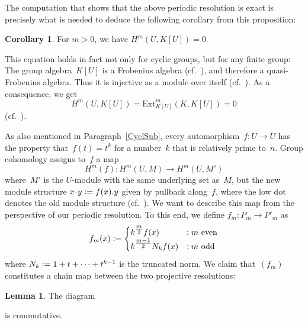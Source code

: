 \documentclass[12pt]{article}
\newcounter{num}
\theoremstyle{definition}
\newtheorem{Lemma}[Satz]{Lemma}
\newtheorem{Cor}[Satz]{Corollary}
\theoremstyle{break}
\newcommand{\Ext}{\mathrm{Ext}}
\renewcommand{\1}{\mathbbm{1}}
\newcommand{\deq}{\vcentcolon =}
\newcommand{\scdot}{\mathbin{\mspace{-3mu} \cdot \mspace{-3mu}}}
\begin{document}
The computation that shows that the above periodic resolution is exact is precisely what is needed to deduce the following corollary from this proposition:
\begin{Cor} \label{CohomReg}
For $m>0$, we have $H^m(U,K[U]) = 0$.
\end{Cor}
This equation holds in fact not only for cyclic groups, but for any finite group: The group algebra~$K[U]$ is a Frobenius algebra (cf.~\cite[Examp.~16.56, p.~442]{La}), and therefore a quasi-Frobenius algebra. Thus it is injective as a module over itself (cf.~\cite[Thm.~15.1, p.~409, Thm.~15.9, p.~412]{La}). As a consequence, we get
\[H^m(U,K[U]) = \Ext_{K[U]}^m(K,K[U]) = 0\]
(cf.~\cite[Chap.~IV, Prop.~7.2, p.~140]{HiS}).

As also mentioned in Paragraph~\ref{CyclSub}, every automorphism~$f \colon U \to U$ has the property that~$f(t) = t^k$ for a number~$k$ that is relatively prime to~$n$. Group cohomology assigns to~$f$ a map
\[H^m(f) \colon H^m(U,M) \to H^m(U,M')\]
where~$M'$ is the $U$-module with the same underlying set as~$M$, but the new module structure \mbox{$x \scdot y \deq f(x).y$} given by pullback along~$f$, where the low dot denotes the old module structure (cf.~\cite[Sec.~9.5.1, p.~564f]{Ro}). We want to describe this map from the perspective of our periodic resolution. To this end, we define $f_m \colon P_m \to P'_m$ as
\[f_m(x) \deq
\begin{cases}
k^{\tfrac{m}{2}} f(x) &: m \text{ even}\\
k^{\tfrac{m-1}{2}} N_k f(x) &: m \text{ odd}
\end{cases}\]
where $N_k \deq 1 + t + \dots + t^{k-1}$ is the truncated norm. We claim that~$(f_m)$ constitutes a chain map between the two projective resolutions:
\begin{Lemma}
The diagram
\begin{center}
\end{center}
is commutative.
\end{Lemma}
\end{document}
